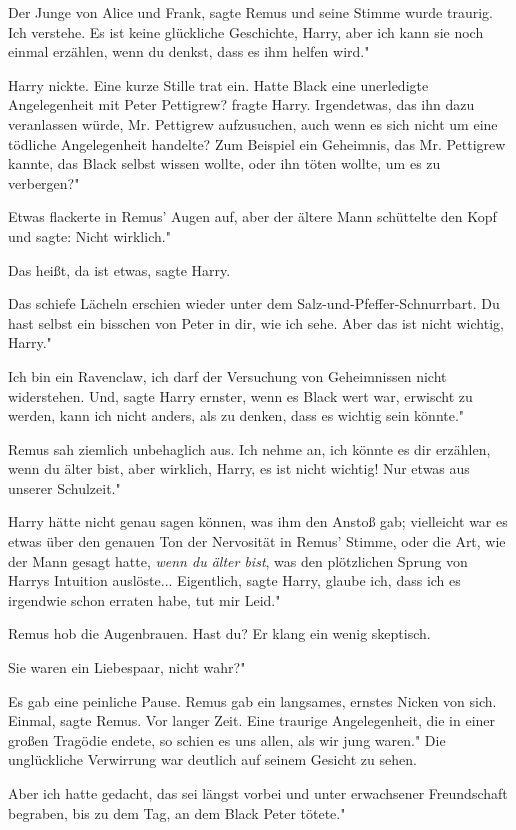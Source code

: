\glqq{}Der Junge von Alice und Frank\grqq{}, sagte Remus und seine Stimme wurde
traurig. \glqq{}Ich verstehe. Es ist keine glückliche Geschichte, Harry, aber ich
kann sie noch einmal erzählen, wenn du denkst, dass es ihm helfen wird."

Harry nickte. Eine kurze Stille trat ein. \glqq{}Hatte Black eine unerledigte
Angelegenheit mit Peter Pettigrew?\grqq{} fragte Harry. \glqq{}Irgendetwas, das
ihn dazu veranlassen würde, Mr. Pettigrew aufzusuchen, auch wenn es sich nicht
um eine tödliche Angelegenheit handelte? Zum Beispiel ein Geheimnis, das Mr.
Pettigrew kannte, das Black selbst wissen wollte, oder ihn töten wollte, um es
zu verbergen?"

Etwas flackerte in Remus' Augen auf, aber der ältere Mann schüttelte den Kopf
und sagte: \glqq{}Nicht wirklich."

\glqq{}Das heißt, da ist etwas\grqq{}, sagte Harry.

Das schiefe Lächeln erschien wieder unter dem Salz-und-Pfeffer-Schnurrbart.
\glqq{}Du hast selbst ein bisschen von Peter in dir, wie ich sehe. Aber das ist
nicht wichtig, Harry."

\glqq{}Ich bin ein Ravenclaw, ich darf der Versuchung von Geheimnissen nicht
widerstehen. Und\grqq{}, sagte Harry ernster, \glqq{}wenn es Black wert war,
erwischt zu werden, kann ich nicht anders, als zu denken, dass es wichtig sein
könnte."

Remus sah ziemlich unbehaglich aus. \glqq{}Ich nehme an, ich könnte es dir
erzählen, wenn du älter bist, aber wirklich, Harry, es ist nicht wichtig! Nur
etwas aus unserer Schulzeit."

Harry hätte nicht genau sagen können, was ihm den Anstoß gab; vielleicht war es
etwas über den genauen Ton der Nervosität in Remus' Stimme, oder die Art, wie
der Mann gesagt hatte, \emph{wenn du älter bist}, was den plötzlichen Sprung von
Harrys Intuition auslöste... \glqq{}Eigentlich\grqq{}, sagte Harry, \glqq{}glaube
ich, dass ich es irgendwie schon erraten habe, tut mir Leid."

Remus hob die Augenbrauen. \glqq{}Hast du?\grqq{} Er klang ein wenig skeptisch.

\glqq{}Sie waren ein Liebespaar, nicht wahr?"

Es gab eine peinliche Pause. Remus gab ein langsames, ernstes Nicken von sich.
\glqq{}Einmal\grqq{}, sagte Remus. \glqq{}Vor langer Zeit. Eine traurige
Angelegenheit, die in einer großen Tragödie endete, so schien es uns allen, als
wir jung waren." Die unglückliche Verwirrung war deutlich auf seinem Gesicht zu
sehen.

\glqq{}Aber ich hatte gedacht, das sei längst vorbei und unter erwachsener
Freundschaft begraben, bis zu dem Tag, an dem Black Peter tötete."

